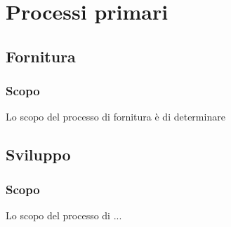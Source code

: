 \section{Processi primari}
\subsection{Fornitura}
\subsubsection{Scopo}
Lo scopo del processo di fornitura è di determinare

\subsection{Sviluppo}
\subsubsection{Scopo}
Lo scopo del processo di ...
